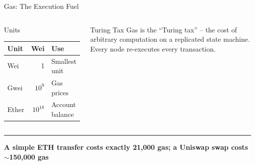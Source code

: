 \documentclass[8pt,aspectratio=169]{beamer}
\newcommand{\bottomnote}[1]{\vfill\vspace{-2mm}\textcolor{mllavender2}{\rule{\textwidth}{0.4pt}}\vspace{1mm}\footnotesize\textbf{#1}}
\begin{document}
\begin{frame}{Gas: The Execution Fuel}
\begin{columns}
\begin{block}{Units}
\begin{tabular}{@{}lrl@{}}
\toprule
\textbf{Unit} & \textbf{Wei} & \textbf{Use} \\
\midrule
Wei & 1 & Smallest unit \\
Gwei & $10^{9}$ & Gas prices \\
Ether & $10^{18}$ & Account balance \\
\bottomrule
\end{tabular}
\end{block}
\vspace{2mm}
\begin{alertblock}{Turing Tax}
\small Gas is the ``Turing tax'' -- the cost of arbitrary computation on a replicated state machine. Every node re-executes every transaction.
\end{alertblock}
\end{columns}
\bottomnote{A simple ETH transfer costs exactly 21,000 gas; a Uniswap swap costs $\sim$150,000 gas}
\end{frame}
\end{document}
